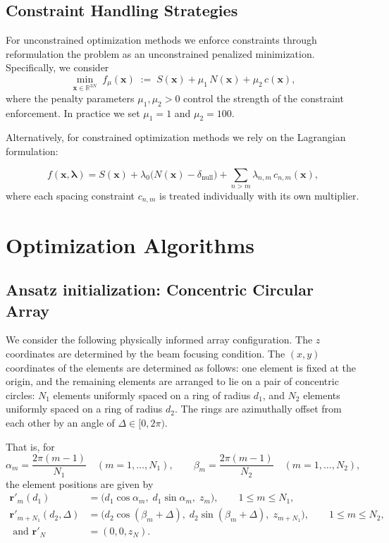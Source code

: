 \documentclass[11pt,letterpaper]{article}
\theoremstyle{definition}
\theoremstyle{plain}
\begin{document}
\subsection{Constraint Handling Strategies}

For unconstrained optimization methods we enforce constraints through reformulation the problem as an unconstrained penalized minimization. Specifically, we consider
\begin{equation}
\label{UnCon_Obj}
\min_{\mathbf{x}\in\mathbb{R}^{3N}} \; f_\mu(\mathbf{x})
\;:=\; S(\mathbf{x}) + \mu_1\,N(\mathbf{x}) +\mu_2\,c(\mathbf{x}),
\end{equation}
where the penalty parameters $\mu_1,\mu_2>0$ control the strength of the constraint enforcement. In practice we set $\mu_1 = 1$ and $\mu_2 = 100$.


Alternatively, for constrained optimization methods we rely on the Lagrangian formulation:

\begin{equation}
f(\mathbf{x}, \boldsymbol{\lambda}) 
= S(\mathbf{x}) 
+ \lambda_0 \big(N(\mathbf{x}) - \delta_{\text{null}}\big) 
+ \sum_{n>m} \lambda_{n,m}\, c_{n,m}(\mathbf{x}),
\label{eq:lagrangian_full}
\end{equation}
where each spacing constraint $c_{n,m}$ is treated individually with its own multiplier.





\section{Optimization Algorithms}
\subsection{Ansatz initialization: Concentric Circular Array}

We consider the following physically informed array configuration. The $z$ coordinates are determined by the beam focusing condition. The $(x,y)$ coordinates of the elements are determined as follows: one element is fixed at the origin, and the remaining elements are arranged to lie on a pair of concentric circles: $N_1$ elements uniformly spaced on a ring of
radius $d_1$, and $N_2$ elements uniformly spaced on a ring of radius $d_2$. The rings are azimuthally offset from each other by an angle of $\Delta\in[0,2\pi)$. 

That is, for
\[
\alpha_m=\frac{2\pi (m-1)}{N_1}\quad(m=1,\dots,N_1),\qquad
\beta_m=\frac{2\pi (m-1)}{N_2}\quad(m=1,\dots,N_2),
\]
the element positions are given by
\begin{align*}
\mathbf{r}'_{m}(d_1)&=\big(d_1\cos\alpha_m,\; d_1\sin\alpha_m,\; z_{m}\big),\qquad 1\leq m \leq N_1, \\
\mathbf{r}'_{m+N_1}(d_2,\Delta)&=\big(d_2\cos(\beta_m+\Delta),\; d_2\sin(\beta_m+\Delta),\; z_{m+N_1}\big), \qquad 1\leq m \leq N_2,\\
\text{ and }\mathbf{r}'_{N} &= (0,0,z_N).
\end{align*}
\end{document}
